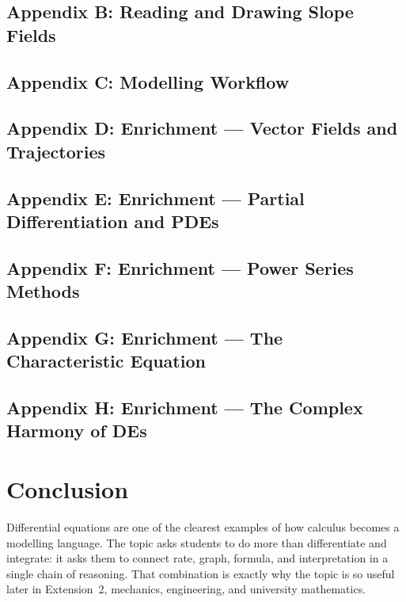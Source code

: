 \documentclass[12pt]{article}
\begin{document}
\subsection{Appendix B: Reading and Drawing Slope Fields}


\subsection{Appendix C: Modelling Workflow}


\subsection{Appendix D: Enrichment --- Vector Fields and Trajectories}


\subsection{Appendix E: Enrichment --- Partial Differentiation and PDEs}


\subsection{Appendix F: Enrichment --- Power Series Methods}


\subsection{Appendix G: Enrichment --- The Characteristic Equation}


\subsection{Appendix H: Enrichment --- The Complex Harmony of DEs}


\newpage
\section{Conclusion}
Differential equations are one of the clearest examples of how calculus becomes a modelling language. The topic asks students to do more than differentiate and integrate: it asks them to connect rate, graph, formula, and interpretation in a single chain of reasoning. That combination is exactly why the topic is so useful later in Extension~2, mechanics, engineering, and university mathematics.
\end{document}
